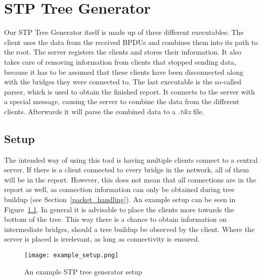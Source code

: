 \chapter{STP Tree Generator}
\label{stp_gen}
Our STP Tree Generator itself is made up of three different executables:
The client uses the data from the received BPDUs and combines them into its path to the root.
The server registers the clients and stores their information.
It also takes care of removing information from clients that stopped sending data, because it has to be assumed that these clients have been disconnected along with the bridges they were connected to.
The last executable is the so-called parser, which is used to obtain the finished report.
It connects to the server with a special message, causing the server to combine the data from the different clients.
Afterwards it will parse the combined data to a \textit{.tikz} file.
\section{Setup}
The intended way of using this tool is having multiple clients connect to a central server.
If there is a client connected to every bridge in the network, all of them will be in the report.
However, this does not mean that all connections are in the report as well, as connection information can only be obtained during tree buildup (see Section~\ref{packet_handling}).
An example setup can be seen in Figure~\ref{fig:example_setup}.
In general it is advisable to place the clients more towards the bottom of the tree.
This way there is a chance to obtain information on intermediate bridges, should a tree buildup be observed by the client.
Where the server is placed is irrelevant, as long as connectivity is ensured.

\begin{figure}[h]
    \centering
    \texttt{[image: example\_setup.png]}
    \caption{An example STP tree generator setup}
    \label{fig:example_setup}
\end{figure}

